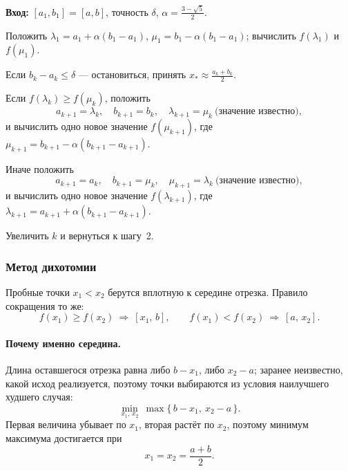 \begin{algo}[title={Метод золотого сечения}]
\textbf{Вход:} $[a_1,b_1] = [a,b]$, точность $\delta$,
$\alpha = \tfrac{3-\sqrt5}{2}$.

\begin{steps}
  \item Положить
        $\lambda_1 = a_1 + \alpha(b_1-a_1)$,
        $\mu_1 = b_1 - \alpha(b_1-a_1)$;
        вычислить $f(\lambda_1)$ и $f(\mu_1)$.
  \item Если $b_k - a_k \le \delta$ — остановиться, принять
        $x_* \approx \tfrac{a_k+b_k}{2}$.
  \item Если $f(\lambda_k) \ge f(\mu_k)$, положить
        \[
          a_{k+1} = \lambda_k, \quad b_{k+1} = b_k, \quad
          \lambda_{k+1} = \mu_k \ \text{(значение известно)},
        \]
        и вычислить одно новое значение
        $f(\mu_{k+1})$, где $\mu_{k+1} = b_{k+1} - \alpha(b_{k+1}-a_{k+1})$.
  \item Иначе положить
        \[
          a_{k+1} = a_k, \quad b_{k+1} = \mu_k, \quad
          \mu_{k+1} = \lambda_k \ \text{(значение известно)},
        \]
        и вычислить одно новое значение
        $f(\lambda_{k+1})$, где $\lambda_{k+1} = a_{k+1} + \alpha(b_{k+1}-a_{k+1})$.
  \item Увеличить $k$ и вернуться к шагу~2.
\end{steps}
\end{algo}

\subsubsection*{Метод дихотомии}

Пробные точки $x_1 < x_2$ берутся вплотную к середине отрезка. Правило
сокращения то же:
\[
  f(x_1) \ge f(x_2) \ \Longrightarrow\ [x_1,\, b] ,
  \qquad
  f(x_1) < f(x_2) \ \Longrightarrow\ [a,\, x_2] .
\]

\paragraph{Почему именно середина.} Длина оставшегося отрезка равна либо
$b - x_1$, либо $x_2 - a$; заранее неизвестно, какой исход реализуется,
поэтому точки выбираются из условия наилучшего худшего случая:
\[
  \min_{x_1,\, x_2} \ \max\big\{\, b - x_1,\ x_2 - a \,\big\} .
\]
Первая величина убывает по $x_1$, вторая растёт по $x_2$, поэтому минимум
максимума достигается при
\[
  x_1 = x_2 = \frac{a+b}{2} .
\]


